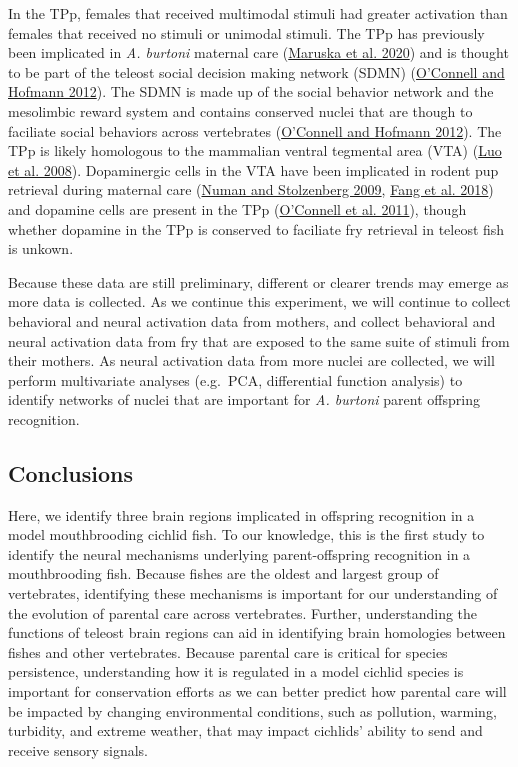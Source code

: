 \documentclass[
  12pt,
]{article}
\begin{document}
In the TPp, females that received multimodal stimuli had greater activation than females that received no stimuli or unimodal stimuli. The TPp has previously been implicated in \emph{A. burtoni} maternal care (\protect\hyperlink{ref-RN18}{Maruska et al. 2020}) and is thought to be part of the teleost social decision making network (SDMN) (\protect\hyperlink{ref-RN33}{O'Connell and Hofmann 2012}). The SDMN is made up of the social behavior network and the mesolimbic reward system and contains conserved nuclei that are though to faciliate social behaviors across vertebrates (\protect\hyperlink{ref-RN33}{O'Connell and Hofmann 2012}). The TPp is likely homologous to the mammalian ventral tegmental area (VTA) (\protect\hyperlink{ref-RN34}{Luo et al. 2008}). Dopaminergic cells in the VTA have been implicated in rodent pup retrieval during maternal care (\protect\hyperlink{ref-RN22}{Numan and Stolzenberg 2009}, \protect\hyperlink{ref-RN20}{Fang et al. 2018}) and dopamine cells are present in the TPp (\protect\hyperlink{ref-RN35}{O'Connell et al. 2011}), though whether dopamine in the TPp is conserved to faciliate fry retrieval in teleost fish is unkown.

Because these data are still preliminary, different or clearer trends may emerge as more data is collected. As we continue this experiment, we will continue to collect behavioral and neural activation data from mothers, and collect behavioral and neural activation data from fry that are exposed to the same suite of stimuli from their mothers. As neural activation data from more nuclei are collected, we will perform multivariate analyses (e.g.~PCA, differential function analysis) to identify networks of nuclei that are important for \emph{A. burtoni} parent offspring recognition.

\hypertarget{conclusions}{%
\subsection{Conclusions}\label{conclusions}}

Here, we identify three brain regions implicated in offspring recognition in a model mouthbrooding cichlid fish. To our knowledge, this is the first study to identify the neural mechanisms underlying parent-offspring recognition in a mouthbrooding fish. Because fishes are the oldest and largest group of vertebrates, identifying these mechanisms is important for our understanding of the evolution of parental care across vertebrates. Further, understanding the functions of teleost brain regions can aid in identifying brain homologies between fishes and other vertebrates. Because parental care is critical for species persistence, understanding how it is regulated in a model cichlid species is important for conservation efforts as we can better predict how parental care will be impacted by changing environmental conditions, such as pollution, warming, turbidity, and extreme weather, that may impact cichlids' ability to send and receive sensory signals.
\end{document}
